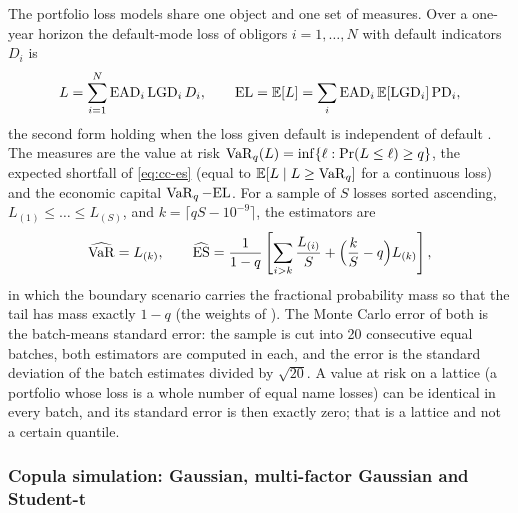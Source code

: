 The portfolio loss models share one object and one set of measures. Over a one-year horizon the default-mode loss of obligors
$i=1,\dots,N$ with default indicators $D_i$ is
\begin{equation}
L=\sum_{i=1}^{N}\mathrm{EAD}_i\,\mathrm{LGD}_i\,D_i,\qquad \mathrm{EL}=\mathbb{E}[L]=\sum_i\mathrm{EAD}_i\,\mathbb{E}[\mathrm{LGD}_i]\,\mathrm{PD}_i,
\label{eq:cc-loss}
\end{equation}
the second form holding when the loss given default is independent of default \citep{credit-capital:acerbitasche2002}. The measures are the
value at risk $\operatorname{VaR}_q(L)=\inf\{\ell:\Pr(L\le\ell)\ge q\}$, the expected shortfall of \cref{eq:cc-es} (equal to $\mathbb{E}[L\mid L\ge\operatorname{VaR}_q]$ for a
continuous loss) and the economic capital $\operatorname{VaR}_q-\mathrm{EL}$. For a sample of $S$ losses sorted ascending, $L_{(1)}\le\dots\le L_{(S)}$, and
$k=\lceil qS - 10^{-9}\rceil$, the estimators are
\begin{equation}
\widehat{\operatorname{VaR}}=L_{(k)},\qquad
\widehat{\operatorname{ES}}=\frac{1}{1-q}\left[\sum_{i>k}\frac{L_{(i)}}{S}+\Big(\frac kS-q\Big)L_{(k)}\right],
\label{eq:cc-sample-es}
\end{equation}
in which the boundary scenario carries the fractional probability mass so that the tail has mass exactly $1-q$ (the weights of
\citealp{credit-capital:acerbitasche2002}). The Monte Carlo error of both is the batch-means standard error: the sample is cut into 20
consecutive equal batches, both estimators are computed in each, and the error is the standard deviation of the batch estimates divided by
$\sqrt{20}$. A value at risk on a lattice (a portfolio whose loss is a whole number of equal name losses) can be identical in every batch,
and its standard error is then exactly zero; that is a lattice and not a certain quantile.

\subsubsection{Copula simulation: Gaussian, multi-factor Gaussian and Student-t}

